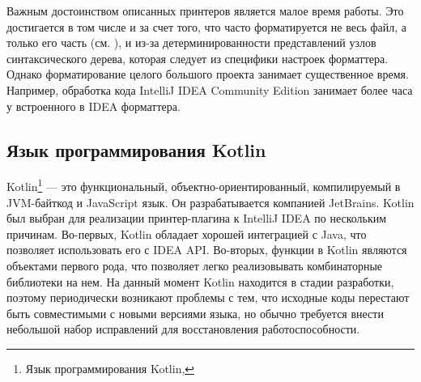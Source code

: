 Важным достоинством описанных принтеров является малое время работы.
Это достигается в том числе и за счет того, что часто форматируется не весь
файл, а только его часть (см. \cite{eclipse}),
и из-за детерминированности представлений узлов синтаксического дерева,
которая следует из специфики настроек форматтера.
Однако форматирование целого большого проекта занимает существенное время.
Например, обработка кода IntelliJ IDEA Community Edition занимает более часа
у встроенного в IDEA форматтера.

\newpage


\subsection{Язык программирования Kotlin}

Kotlin\footnote{Язык программирования Kotlin, }
--- это функциональный, объектно-ориентированный, компилируемый
в JVM-байткод и JavaScript язык.
Он разрабатывается компанией JetBrains.
Kotlin был выбран для реализации принтер-плагина к IntelliJ IDEA по нескольким
причинам. 
Во-первых, Kotlin обладает хорошей интеграцией с Java, что позволяет
использовать его с IDEA API. 
Во-вторых, функции в Kotlin являются объектами первого рода, что позволяет
легко реализовывать комбинаторные библиотеки на нем.
На данный момент Kotlin находится в стадии разработки, поэтому
периодически возникают
проблемы с тем, что исходные коды перестают быть совместимыми с новыми
версиями языка,
но обычно требуется внести небольшой набор исправлений для
восстановления работоспособности.
